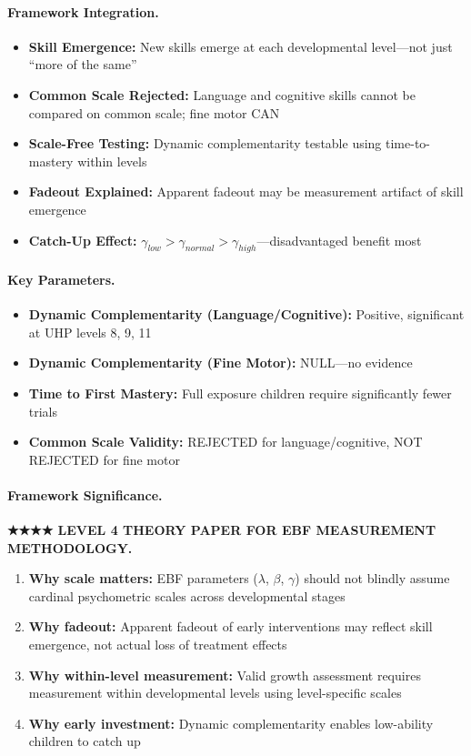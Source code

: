 \paragraph{Framework Integration.}
\begin{itemize}
  \item \textbf{Skill Emergence:} New skills emerge at each developmental level---not just ``more of the same''
  \item \textbf{Common Scale Rejected:} Language and cognitive skills cannot be compared on common scale; fine motor CAN
  \item \textbf{Scale-Free Testing:} Dynamic complementarity testable using time-to-mastery within levels
  \item \textbf{Fadeout Explained:} Apparent fadeout may be measurement artifact of skill emergence
  \item \textbf{Catch-Up Effect:} $\gamma_{low} > \gamma_{normal} > \gamma_{high}$---disadvantaged benefit most
\end{itemize}

\paragraph{Key Parameters.}
\begin{itemize}
  \item \textbf{Dynamic Complementarity (Language/Cognitive):} Positive, significant at UHP levels 8, 9, 11
  \item \textbf{Dynamic Complementarity (Fine Motor):} NULL---no evidence
  \item \textbf{Time to First Mastery:} Full exposure children require significantly fewer trials
  \item \textbf{Common Scale Validity:} REJECTED for language/cognitive, NOT REJECTED for fine motor
\end{itemize}

\paragraph{Framework Significance.}
\textbf{★★★★ LEVEL 4 THEORY PAPER FOR EBF MEASUREMENT METHODOLOGY.}
\begin{enumerate}
  \item \textbf{Why scale matters:} EBF parameters ($\lambda$, $\beta$, $\gamma$) should not blindly
        assume cardinal psychometric scales across developmental stages
  \item \textbf{Why fadeout:} Apparent fadeout of early interventions may reflect skill emergence,
        not actual loss of treatment effects
  \item \textbf{Why within-level measurement:} Valid growth assessment requires measurement within
        developmental levels using level-specific scales
  \item \textbf{Why early investment:} Dynamic complementarity enables low-ability children to catch up
\end{enumerate}

